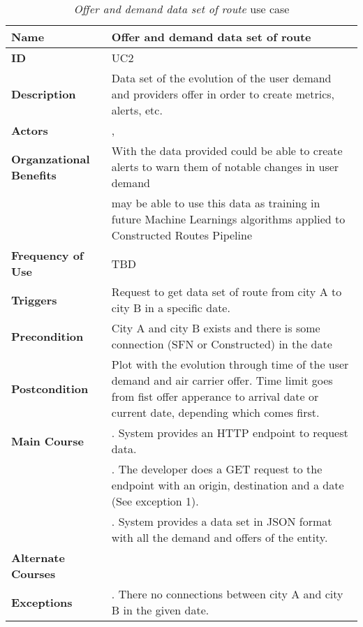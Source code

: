 \begin{table}
\begin{tabular}{|>{\raggedright\arraybackslash}p{3.2cm}|>{\raggedright\arraybackslash}p{10cm}|}
\hline
\textbf{Name}                   & Offer and demand data set of route \\
\hline
\textbf{ID}                     & UC2 \\
\hline
\textbf{Description}            & Data set of the evolution of the user demand and providers offer in order to create metrics, alerts, etc. \\
\hline
\textbf{Actors}                 & \nameref{mas}, \nameref{dlr} \\
\hline
\textbf{Organzational Benefits} & With the data provided \nameref{mas} could be able to create alerts to warn them of notable changes in user demand \\
                                & \nameref{dlr} may be able to use this data as training in future Machine Learnings algorithms applied to Constructed Routes Pipeline \\
\hline
\textbf{Frequency of Use}       & TBD \\
\hline
\textbf{Triggers}               & Request to get data set of route from city A to city B in a specific date. \\
\hline
\textbf{Precondition}           & City A and city B exists and there is some connection (SFN or Constructed) in the date \\
\hline
\textbf{Postcondition}          & Plot with the evolution through time of the user demand and air carrier offer. Time limit goes from fist offer apperance to arrival date or current date, depending which comes first. \\
\hline
\textbf{Main Course}            & 1. System provides an HTTP endpoint to request data. \\
                                & 2. The developer does a GET request to the endpoint with an origin, destination and a date (See exception 1). \\
                                & 3. System provides a data set in JSON format with all the demand and offers of the entity. \\
\hline
\textbf{Alternate Courses}      & \\
\hline
\textbf{Exceptions}             & 1. There no connections between city A and city B in the given date. \\
\hline
\end{tabular}
\caption{\textit{Offer and demand data set of route} use case}
\label{UC2}
\end{table}

